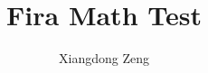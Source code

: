 \documentclass{article}
\title{Fira Math Test}
\author{Xiangdong Zeng}
\begin{document}
\maketitle

\tableofcontents

\clearpage

\makeatletter
\ExplSyntaxOn



\ExplSyntaxOff
\makeatother
\end{document}
